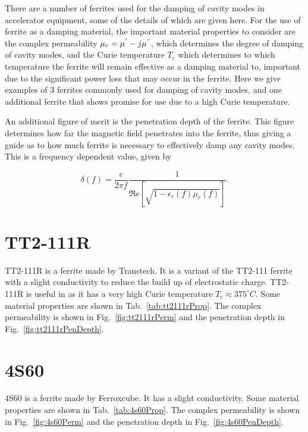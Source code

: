 \label{app:ferrProp}

There are a number of ferrites used for the damping of cavity modes in accelerator equipment, some of the details of which are given here. For the use of ferrite as a damping material, the important material properties to consider are the complex permeability $\mu_{r} = \mu^{'} - j\mu^{"}$, which determines the degree of damping of cavity modes, and the Curie temperature $T_{c}$ which determines to which temperature the ferrite will remain effective as a damping material to, important due to the significant power loss that may occur in the ferrite. Here we give examples of 3 ferrites commonly used for damping of cavity modes, and one additional ferrite that shows promise for use due to a high Curie temperature.

An additional figure of merit is the penetration depth of the ferrite. This figure determines how far the magnetic field penetrates into the ferrite, thus giving a guide as to how much ferrite is necessary to effectively damp any cavity modes. This is a frequency dependent value, given by

\begin{equation}
\delta\left( f \right) = \frac{c}{2\pi f}\frac{1}{\Re{}e\left[\sqrt{1-\epsilon_{r}\left( f \right) \mu_{r}\left( f \right)}\right]}.
\end{equation}

\section{TT2-111R}

TT2-111R is a ferrite made by Transtech. It is a variant of the TT2-111 ferrite with a slight conductivity to reduce the build up of electrostatic charge. TT2-111R is useful in as it has a very high Curie temperature $T_{c}\approx 375^{\circ}C$. Some material properties are shown in Tab.~\ref{tab:tt2111rProp}. The complex permeability is shown in Fig.~\ref{fig:tt2111rPerm} and the penetration depth in Fig.~\ref{fig:tt2111rPenDepth}.

\section{4S60}

4S60 is a ferrite made by Ferroxcube. It has a slight conductivity. Some material properties are shown in Tab.~\ref{tab:4s60Prop}. The complex permeability is shown in Fig.~\ref{fig:4s60Perm} and the penetration depth in Fig.~\ref{fig:4s60PenDepth}.

